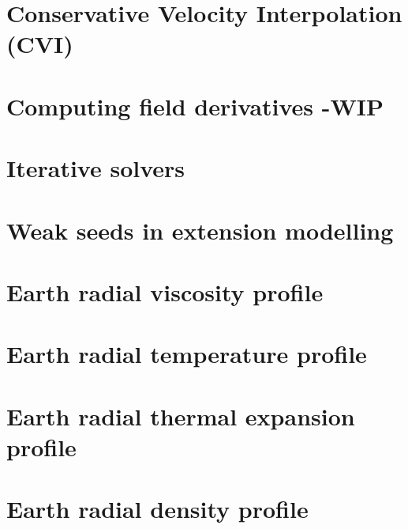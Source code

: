 \section{Conservative Velocity Interpolation (CVI)} \label{sec:cvi} %
\newpage %
\section{Computing field derivatives -WIP} \label{ss:nodderiv}  %
\newpage %
\section{Iterative solvers \label{ss:itsolvers}}  %
\newpage %
\section{Weak seeds in extension modelling \label{ss:weakseeds}}  %
\newpage %
\section{Earth radial viscosity profile \label{ss:viscprof}}  %
\newpage %
\section{Earth radial temperature profile \label{ss:adiab}}  %
\newpage %
\section{Earth radial thermal expansion profile}  %
\newpage %
\section{Earth radial density profile}  %
\newpage %
